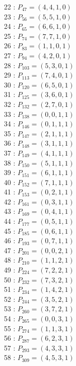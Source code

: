 \documentclass{article}
\begin{document}
{\begin{multicols}{3}
22 : $P_{47}=( 4, 4, 1, 0 )$\\
23 : $P_{56}=( 5, 5, 1, 0 )$\\
24 : $P_{65}=( 6, 6, 1, 0 )$\\
25 : $P_{74}=( 7, 7, 1, 0 )$\\
26 : $P_{83}=( 1, 1, 0, 1 )$\\
27 : $P_{94}=( 4, 2, 0, 1 )$\\
28 : $P_{103}=( 5, 3, 0, 1 )$\\
29 : $P_{113}=( 7, 4, 0, 1 )$\\
30 : $P_{120}=( 6, 5, 0, 1 )$\\
31 : $P_{125}=( 3, 6, 0, 1 )$\\
32 : $P_{132}=( 2, 7, 0, 1 )$\\
33 : $P_{138}=( 0, 0, 1, 1 )$\\
34 : $P_{146}=( 0, 1, 1, 1 )$\\
35 : $P_{147}=( 2, 1, 1, 1 )$\\
36 : $P_{148}=( 3, 1, 1, 1 )$\\
37 : $P_{149}=( 4, 1, 1, 1 )$\\
38 : $P_{150}=( 5, 1, 1, 1 )$\\
39 : $P_{151}=( 6, 1, 1, 1 )$\\
40 : $P_{152}=( 7, 1, 1, 1 )$\\
41 : $P_{153}=( 0, 2, 1, 1 )$\\
42 : $P_{161}=( 0, 3, 1, 1 )$\\
43 : $P_{169}=( 0, 4, 1, 1 )$\\
44 : $P_{177}=( 0, 5, 1, 1 )$\\
45 : $P_{185}=( 0, 6, 1, 1 )$\\
46 : $P_{193}=( 0, 7, 1, 1 )$\\
47 : $P_{201}=( 0, 0, 2, 1 )$\\
48 : $P_{210}=( 1, 1, 2, 1 )$\\
49 : $P_{224}=( 7, 2, 2, 1 )$\\
50 : $P_{232}=( 7, 3, 2, 1 )$\\
51 : $P_{234}=( 1, 4, 2, 1 )$\\
52 : $P_{244}=( 3, 5, 2, 1 )$\\
53 : $P_{260}=( 3, 7, 2, 1 )$\\
54 : $P_{265}=( 0, 0, 3, 1 )$\\
55 : $P_{274}=( 1, 1, 3, 1 )$\\
56 : $P_{287}=( 6, 2, 3, 1 )$\\
57 : $P_{293}=( 4, 3, 3, 1 )$\\
58 : $P_{309}=( 4, 5, 3, 1 )$\\

\end{multicols}}
\end{document}
